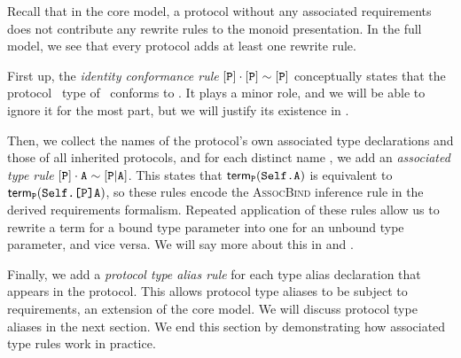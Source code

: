 \documentclass[../generics]{subfiles}
\begin{document}
Recall that in the core model, a protocol without any associated requirements does not contribute any rewrite rules to the monoid presentation. In the full model, we see that every protocol adds at least one rewrite rule.

First up, the \emph{identity conformance rule} $[\texttt{P}]\cdot[\texttt{P}] \sim [\texttt{P}]$ conceptually states that the protocol \tSelf\ type of \tP\ conforms to \tP. It plays a minor role, and we will be able to ignore it for the most part, but we will justify its existence in .

Then, we collect the names of the protocol's own associated type declarations and those of all inherited protocols, and for each distinct name \nA, we add an \emph{associated type rule} $[\texttt{P}]\cdot\texttt{A} \sim [\texttt{P}|\texttt{A}]$. This states that $\mathsf{term}_{\texttt{P}}(\texttt{Self.A})$ is equivalent to $\mathsf{term}_{\texttt{P}}(\texttt{Self.[P]A})$, so these rules encode the \textsc{AssocBind} inference rule in the derived requirements formalism. Repeated application of these rules allow us to rewrite a term for a bound type parameter into one for an unbound type parameter, and vice versa. We will say more about this in  and .

Finally, we add a \emph{protocol type alias rule} for each type alias declaration that appears in the protocol. This allows protocol type aliases to be subject to requirements, an extension of the core model. We will discuss protocol type aliases in the next section. We end this section by demonstrating how associated type rules work in practice.
\end{document}
